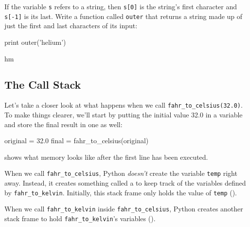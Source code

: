 \documentclass{book}
\begin{document}
\begin{challenge}
  If the variable \texttt{s} refers to a string, then \texttt{s{[}0{]}}
  is the string's first character and \texttt{s{[}-1{]}} is its last.
  Write a function called \texttt{outer} that returns a string made up
  of just the first and last characters of its input:

\begin{VerbIn}
print outer('helium')
\end{VerbIn}

\begin{VerbOut}
hm
\end{VerbOut}
\end{challenge}

\subsection{The Call Stack}

Let's take a closer look at what happens when we call
\texttt{fahr\_to\_celsius(32.0)}. To make things clearer, we'll start by
putting the initial value 32.0 in a variable and store the final result
in one as well:

\begin{VerbIn}
original = 32.0
final = fahr_to_celsius(original)
\end{VerbIn}


 shows what memory looks like after the first line has
been executed.

When we call \texttt{fahr\_to\_celsius}, Python \emph{doesn't} create
the variable \texttt{temp} right away. Instead, it creates something
called a  to keep track of the
variables defined by \texttt{fahr\_to\_kelvin}. Initially, this stack
frame only holds the value of \texttt{temp} ().


When we call \texttt{fahr\_to\_kelvin} inside
\texttt{fahr\_to\_celsius}, Python creates another stack frame to hold
\texttt{fahr\_to\_kelvin}'s variables ().

\end{document}
